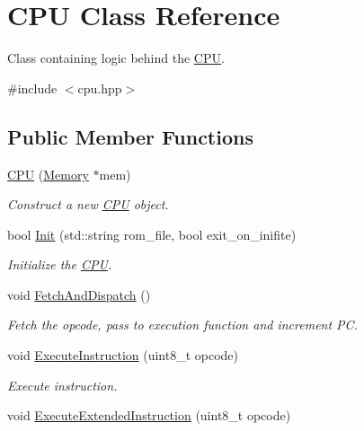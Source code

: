 \hypertarget{classCPU}{}\section{C\+PU Class Reference}
\label{classCPU}


Class containing logic behind the \mbox{\hyperlink{classCPU}{C\+PU}}.  




{\ttfamily \#include $<$cpu.\+hpp$>$}

\subsection*{Public Member Functions}
\begin{DoxyCompactItemize}
\item 
\mbox{\hyperlink{classCPU_a398bb4352a0dbaa9b2010f2084d9f8f7}{C\+PU}} (\mbox{\hyperlink{classMemory}{Memory}} $\ast$mem)
\begin{DoxyCompactList}\small\item\em Construct a new \mbox{\hyperlink{classCPU}{C\+PU}} object. \end{DoxyCompactList}\item 
bool \mbox{\hyperlink{classCPU_a72afeb809bf193928349e6f948f60bfc}{Init}} (std\+::string rom\+\_\+file, bool exit\+\_\+on\+\_\+inifite)
\begin{DoxyCompactList}\small\item\em Initialize the \mbox{\hyperlink{classCPU}{C\+PU}}. \end{DoxyCompactList}\item 
\mbox{\label{classCPU_a2f9a20451dd54b219cc09a879ff483da}} 
void \mbox{\hyperlink{classCPU_a2f9a20451dd54b219cc09a879ff483da}{Fetch\+And\+Dispatch}} ()
\begin{DoxyCompactList}\small\item\em Fetch the opcode, pass to execution function and increment PC. \end{DoxyCompactList}\item 
void \mbox{\hyperlink{classCPU_ad8e103aaedd1c250d33f9cc373f2f16b}{Execute\+Instruction}} (uint8\+\_\+t opcode)
\begin{DoxyCompactList}\small\item\em Execute instruction. \end{DoxyCompactList}\item 
void \mbox{\hyperlink{classCPU_ac2cebcf2ac957a884175b94ff5f62c15}{Execute\+Extended\+Instruction}} (uint8\+\_\+t opcode)

\end{DoxyCompactItemize}
